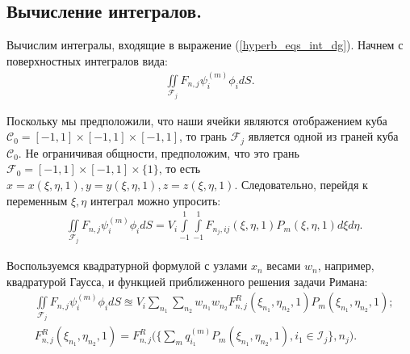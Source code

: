 \documentclass[14pt, a4paper, fleqn]{extreport}
\begin{document}
	\subsection{Вычисление интегралов.}
	
	Вычислим интегралы, входящие в выражение (\ref{hyperb_eqs_int_dg}).
	Начнем с поверхностных интегралов вида:
	\begin{equation*}
	\begin{split}
		\iint\limits_{\mathcal{F}_j} F_{n,j} \psi_i^{(m)} \phi_i dS.
	\end{split}
	\end{equation*}
	
	Поскольку мы предположили, что наши ячейки являются отображением 
	куба $\mathcal{C}_0 = [-1,1] \times [-1,1] \times [-1,1]$,
	то грань $\mathcal{F}_j$ является одной из граней куба $\mathcal{C}_0$.
	Не ограничивая общности, предположим, что это 
	грань $\mathcal{F}_0 = [-1,1] \times [-1,1] \times \lbrace 1 \rbrace$,
	то есть $x=x(\xi,\eta,1),y=y(\xi,\eta,1),z=z(\xi,\eta,1)$.
	Следовательно, перейдя к переменным $\xi,\eta$ интеграл можно упросить:
	\begin{equation*}
	\begin{split}
		&\iint\limits_{\mathcal{F}_j} F_{n,j} \psi_i^{(m)} \phi_i dS 
			= V_i \int\limits_{-1}^{1} \int\limits_{-1}^{1} 
				F_{n_j,ij}(\xi,\eta,1)P_m(\xi,\eta,1)d\xi d\eta.
	\end{split}
	\end{equation*}
	
	Воспользуемся квадратурной формулой с узлами $x_n$ весами $w_n$,
	например, квадратурой Гаусса, и функцией приближенного решения задачи Римана:
	\begin{equation*}
	\begin{split}
		&\iint\limits_{\mathcal{F}_j} F_{n,j} \psi_i^{(m)} \phi_i dS
			\approxeq V_i \sum\limits_{n_1} 
				\sum\limits_{n_2} w_{n_1} w_{n_2} 
					F_{n,j}^R(\xi_{n_1},\eta_{n_2},1) P_m(\xi_{n_1},\eta_{n_2},1); \\
		&F_{n,j}^R(\xi_{n_1},\eta_{n_2},1) 
			= F_{n,j}^R \Big( \Big\lbrace \sum\limits_m q_{i_1}^{(m)} 
				P_m(\xi_{n_1},\eta_{n_2},1), i_1 \in \mathcal{I}_j \Big\rbrace, n_{j} \Big).
	\end{split}
	\end{equation*}
	
\end{document}
